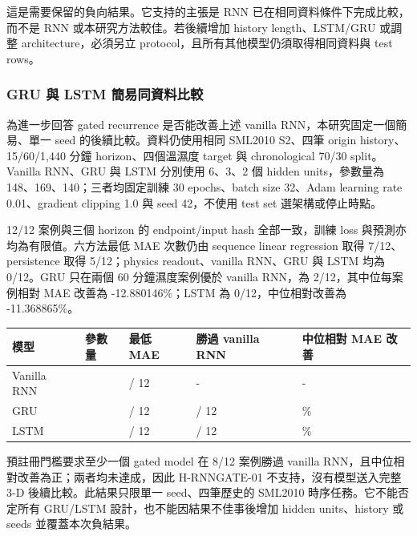 \documentclass[12pt,a4paper]{article}
\begin{document}
這是需要保留的負向結果。它支持的主張是 RNN 已在相同資料條件下完成比較，而不是 RNN 或本研究方法較佳。若後續增加 history length、LSTM/GRU 或調整 architecture，必須另立 protocol，且所有其他模型仍須取得相同資料與 test rows。


\subsubsection*{GRU 與 LSTM 簡易同資料比較}

為進一步回答 gated recurrence 是否能改善上述 vanilla RNN，本研究固定一個簡易、單一 seed 的後續比較。資料仍使用相同 SML2010 S2、四筆 origin history、15/60/1,440 分鐘 horizon、四個溫濕度 target 與 chronological 70/30 split。Vanilla RNN、GRU 與 LSTM 分別使用 6、3、2 個 hidden units，參數量為 148、169、140；三者均固定訓練 30 epochs、batch size 32、Adam learning rate 0.01、gradient clipping 1.0 與 seed 42，不使用 test set 選架構或停止時點。


12/12 案例與三個 horizon 的 endpoint/input hash 全部一致，訓練 loss 與預測亦均為有限值。六方法最低 MAE 次數仍由 sequence linear regression 取得 7/12、persistence 取得 5/12；physics readout、vanilla RNN、GRU 與 LSTM 均為 0/12。GRU 只在兩個 60 分鐘濕度案例優於 vanilla RNN，為 2/12，其中位每案例相對 MAE 改善為 -12.880146\%；LSTM 為 0/12，中位相對改善為 -11.368865\%。


\begin{table}[htbp]
\centering
\footnotesize
\renewcommand{\arraystretch}{1.25}
\begin{tabular}{|>{\raggedright\arraybackslash}p{}|>{\raggedright\arraybackslash}p{}|>{\raggedright\arraybackslash}p{}|>{\raggedright\arraybackslash}p{}|>{\raggedright\arraybackslash}p{}|}
\hline
\textbf{模型} & \textbf{參數量} & \textbf{最低 MAE} & \textbf{勝過 vanilla RNN} & \textbf{中位相對 MAE 改善} \\
\hline
Vanilla RNN & 148 & 0 / 12 & - & - \\
\hline
GRU & 169 & 0 / 12 & 2 / 12 & -12.880146\% \\
\hline
LSTM & 140 & 0 / 12 & 0 / 12 & -11.368865\% \\
\hline
\end{tabular}
\end{table}

預註冊門檻要求至少一個 gated model 在 8/12 案例勝過 vanilla RNN，且中位相對改善為正；兩者均未達成，因此 H-RNNGATE-01 不支持，沒有模型送入完整 3-D 後續比較。此結果只限單一 seed、四筆歷史的 SML2010 時序任務。它不能否定所有 GRU/LSTM 設計，也不能因結果不佳事後增加 hidden units、history 或 seeds 並覆蓋本次負結果。
\end{document}
